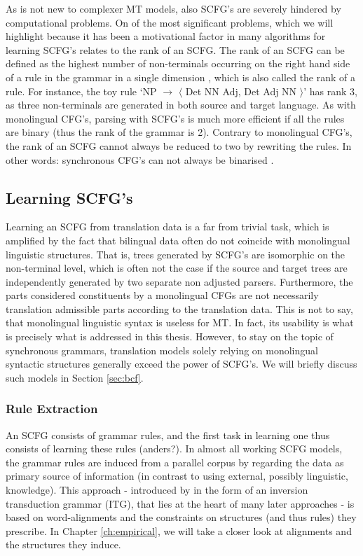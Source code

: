 \documentclass{report}
\theoremstyle{break}
\begin{document}
As is not new to complexer MT models, also SCFG's are severely hindered by computational problems. On of the most significant problems, which we will highlight because it has been a motivational factor in many algorithms for learning SCFG's \citep[e.g.,]{zhang2006synchronous,zhang2008extracting} relates to the rank of an SCFG. The rank of an SCFG can be defined as the highest number of non-terminals occurring on the right hand side of a rule in the grammar in a single dimension \citep{gildea2006factoring}, which is also called the rank of a rule. For instance, the toy rule `NP $\rightarrow$ $\langle$ Det NN Adj, Det Adj NN $\rangle$' has rank 3, as three non-terminals are generated in both source and target language. As with monolingual CFG's, parsing with SCFG's is much more efficient if all the rules are binary (thus the rank of the grammar is 2). Contrary to monolingual CFG's, the rank of an SCFG cannot always be reduced to two by rewriting the rules. In other words: synchronous CFG's can not always be binarised \citep{huang2009binarization}. 


\subsection{Learning SCFG's}
\label{subsec:learningSCFGs}

Learning an SCFG from translation data is a far from trivial task, which is amplified by the fact that bilingual data often do not coincide with monolingual linguistic structures. That is, trees generated by SCFG's are isomorphic on the non-terminal level, which is often not the case if the source and target trees are independently generated by two separate non adjusted parsers. Furthermore, the parts considered constituents by a monolingual CFGs are not necessarily translation admissible parts according to the translation data. This is not to say, that monolingual linguistic syntax is useless for MT. In fact, its usability is what is precisely what is addressed in this thesis. However, to stay on the topic of synchronous grammars, translation models solely relying on monolingual syntactic structures generally exceed the power of SCFG's. We will briefly discuss such models in Section \ref{sec:bcf}.

\subsubsection{Rule Extraction}

An SCFG consists of grammar rules, and the first task in learning one thus consists of learning these rules (anders?). In almost all working SCFG models, the grammar rules are induced from a parallel corpus by regarding the data as primary source of information (in contrast to using external, possibly linguistic, knowledge). This approach - introduced by \cite{wu1995algorithm} in the form of an inversion transduction grammar (ITG), that lies at the heart of many later approaches - is based on word-alignments and the constraints on structures (and thus rules) they prescribe. In Chapter \ref{ch:empirical}, we will take a closer look at alignments and the structures they induce. 
\end{document}
